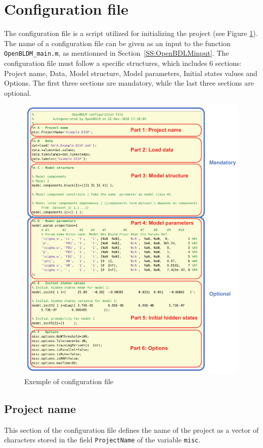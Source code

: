 \section{Configuration file}
\label{S:CFGFile}
The configuration file is a \MATLAB{} script utilized for initializing the project (see Figure \ref{fig:cfgfile}).
The name of a configuration file can be given as an input to the function   \lstinline[basicstyle = \mlttfamily \small ]!OpenBLDM_main.m!, as mentionned in Section~\ref{SS:OpenBDLMinput}.
The configuration file must follow a specific structures, which includes 6 sections: Project name, Data, Model structure, Model parameters, Initial states values and Options.
The first three sections are mandatory, while the last three sections are optional.
\begin{figure}[h!]
\centering
\includegraphics[width=140mm]{docfigs/Example_DISPSIM/listing/config_file_1.pdf}
\caption{Exemple of configuration file}
\label{fig:cfgfile}
\end{figure}

\subsection{Project name}
This section of the configuration file defines the name of the project as a vector of characters stored in the field \lstinline[basicstyle = \mlttfamily \small ]!ProjectName! of the \MATLAB{} variable \lstinline[basicstyle = \mlttfamily \small ]!misc!.

